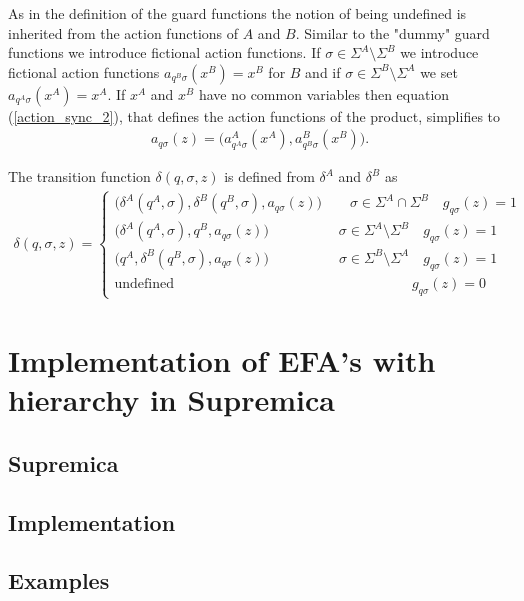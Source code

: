 \documentclass{article}
\begin{document}
As in the definition of the guard functions the notion of being
undefined is inherited from the action functions of $A$ and $B$.
Similar to the "dummy" guard functions we introduce fictional
action functions. If $\sigma\in \Sigma^A \setminus \Sigma^B$ we
introduce fictional action functions $a_{q^B\sigma}(x^B)=x^B$ for
$B$ and if $\sigma\in\Sigma^B\setminus \Sigma^A$ we set
$a_{q^A\sigma}(x^A)=x^A$. If $x^{A}$ and $x^{B}$ have no common
variables then equation (\ref{action_sync_2}), that defines the
action functions of the product, simplifies to
\begin{eqnarray}
a_{q \sigma}(z)=
 \big(a^A_{q^A \sigma}(x^{A}), a^B_{q^B \sigma}(x^{B})\big).
\end{eqnarray}


 The transition function
$\delta(q,\sigma,z)$ is defined from $\delta^A$ and $\delta^B$ as
\begin{eqnarray}
\delta(q,\sigma,z)=\left\{
\begin{array}{ll}
\big(\delta^A(q^A,\sigma),\delta^B(q^B,\sigma),a_{q \sigma}(z)\big) \quad\quad \sigma\in \Sigma^A \cap \Sigma^B \quad g_{q \sigma}(z)=1\\
\big(\delta^A(q^A,\sigma),q^B,a_{q \sigma}(z)\big) \quad\quad\quad\quad\quad \sigma\in \Sigma^A \setminus \Sigma^B \quad g_{q \sigma}(z)=1\\
\big(q^A,\delta^B(q^B,\sigma),a_{q \sigma}(z)\big) \quad\quad\quad\quad\quad \sigma\in \Sigma^B \setminus \Sigma^A \quad g_{q \sigma}(z)=1\\
\textrm{
undefined}\quad\quad\quad\quad\quad\quad\quad\quad\quad\quad\quad\quad\quad\quad\quad\quad\quad
g_{q\sigma}(z)=0
\end{array}\right.
\end{eqnarray}

\section{Implementation of EFA's with hierarchy in Supremica}

\subsection{Supremica}

\subsection{Implementation}\label{Implementation}
\subsection{Examples}
\end{document}
